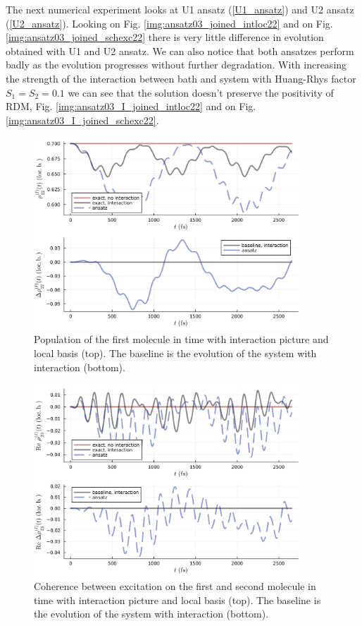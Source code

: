 The next numerical experiment looks at U1 ansatz (\ref{U1_ansatz}) and U2 ansatz (\ref{U2_ansatz}). Looking on Fig. \ref{img:ansatz03_joined_intloc22} and on Fig. \ref{img:ansatz03_joined_schexc22} there is very little difference in evolution obtained with U1 and U2 ansatz. We can also notice that both ansatzes perform badly as the evolution progresses without further degradation. With increasing the strength of the interaction between bath and system with Huang-Rhys factor $S_1=S_2=0.1$ we can see that the solution doesn't preserve the positivity of RDM, Fig. \ref{img:ansatz03_I_joined_intloc22} and on Fig. \ref{img:ansatz03_I_joined_schexc22}. 


\newpage
\begin{figure}[H]
\centering
\includegraphics[width=0.9\textwidth]{img/explain_graphs/explain_graphs_joined_intloc22.png}
\caption{Population of the first molecule in time with interaction picture and local basis (top). The baseline is the evolution of the system with interaction (bottom).}
\label{img:explain_graphs_joined_intloc22}
\end{figure}

\begin{figure}[H]
\centering
\includegraphics[width=0.9\textwidth]{img/explain_graphs/explain_graphs_joined_intloc23.png}
\caption{Coherence between excitation on the first and second molecule in time with interaction picture and local basis (top). The baseline is the evolution of the system with interaction (bottom).}
\label{img:explain_graphs_joined_intloc23}
\end{figure}

